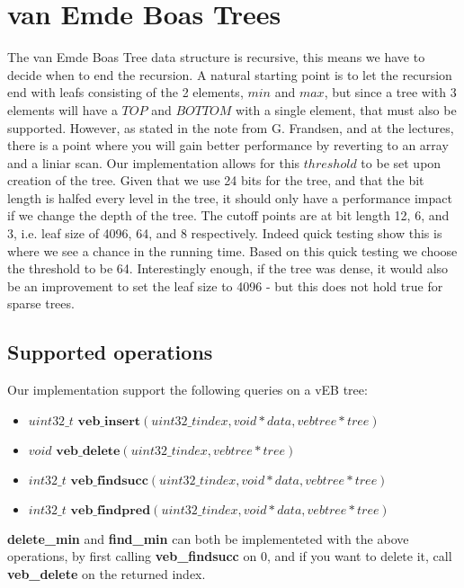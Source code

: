 \section*{van Emde Boas Trees}
The van Emde Boas Tree data structure is recursive, this means we have to decide when to end the recursion. A natural starting point is to let the recursion end with leafs consisting of the 2 elements, $min$ and $max$, but since a tree with 3 elements will have a $TOP$ and $BOTTOM$ with a single element, that must also be supported. However, as stated in the note from G. Frandsen, and at the lectures, there is a point where you will gain better performance by reverting to an array and a liniar scan. Our implementation allows for this $threshold$ to be set upon creation of the tree. Given that we use 24 bits for the tree, and that the bit length is halfed every level in the tree, it should only have a performance impact if we change the depth of the tree. The cutoff points are at bit length 12, 6, and 3, i.e. leaf size of 4096, 64, and 8 respectively. Indeed quick testing show this is where we see a chance in the running time. Based on this quick testing we choose the threshold to be 64. Interestingly enough, if the tree was dense, it would also be an improvement to set the leaf size to 4096 - but this does not hold true for sparse trees.

\subsection*{Supported operations}
Our implementation support the following queries on a vEB tree:

\begin{itemize}
\item $uint32\_t \textbf{ veb\_insert}(uint32\_t index, void * data, vebtree * tree)$
\item $void \textbf{ veb\_delete}(uint32\_t index, vebtree * tree)$
\item $int32\_t \textbf{ veb\_findsucc}(uint32\_t index, void * data, vebtree *tree)$
\item $int32\_t \textbf{ veb\_findpred}(uint32\_t index, void * data, vebtree *tree)$
\end{itemize}

\textbf{delete\_min} and \textbf{find\_min} can both be implementeted with the above operations, by first calling \textbf{veb\_findsucc} on $0$, and if you want to delete it, call \textbf{veb\_delete} on the returned index.


